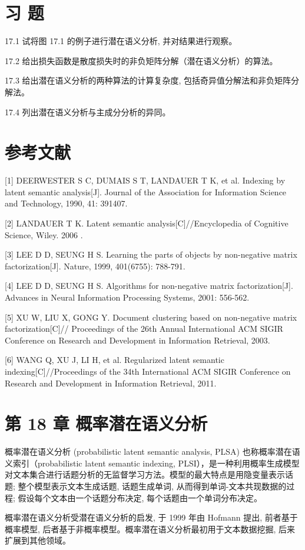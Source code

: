 \documentclass[10pt]{article}
\begin{document}
\section*{习 题}
17.1 试将图 17.1 的例子进行潜在语义分析, 并对结果进行观察。

17.2 给出损失函数是散度损失时的非负矩阵分解（潜在语义分析）的算法。

17.3 给出潜在语义分析的两种算法的计算复杂度, 包括奇异值分解法和非负矩阵分解法。

17.4 列出潜在语义分析与主成分分析的异同。

\section*{参考文献}
[1] DEERWESTER S C, DUMAIS S T, LANDAUER T K, et al. Indexing by latent semantic analysis[J]. Journal of the Association for Information Science and Technology, 1990, 41: 391407.

[2] LANDAUER T K. Latent semantic analysis[C]//Encyclopedia of Cognitive Science, Wiley. 2006 .

[3] LEE D D, SEUNG H S. Learning the parts of objects by non-negative matrix factorization[J]. Nature, 1999, 401(6755): 788-791.

[4] LEE D D, SEUNG H S. Algorithms for non-negative matrix factorization[J]. Advances in Neural Information Processing Systems, 2001: 556-562.

[5] XU W, LIU X, GONG Y. Document clustering based on non-negative matrix factorization[C]// Proceedings of the 26th Annual International ACM SIGIR Conference on Research and Development in Information Retrieval, 2003.

[6] WANG Q, XU J, LI H, et al. Regularized latent semantic indexing[C]//Proceedings of the 34th International ACM SIGIR Conference on Research and Development in Information Retrieval, 2011.

\section*{第 18 章 概率潜在语义分析}
概率潜在语义分析 (probabilistic latent semantic analysis, PLSA) 也称概率潜在语义索引（probabilistic latent semantic indexing, PLSI），是一种利用概率生成模型对文本集合进行话题分析的无监督学习方法。模型的最大特点是用隐变量表示话题; 整个模型表示文本生成话题, 话题生成单词, 从而得到单词-文本共现数据的过程; 假设每个文本由一个话题分布决定, 每个话题由一个单词分布决定。

概率潜在语义分析受潜在语义分析的启发, 于 1999 年由 Hofmann 提出, 前者基于概率模型, 后者基于非概率模型。概率潜在语义分析最初用于文本数据挖掘, 后来扩展到其他领域。
\end{document}
